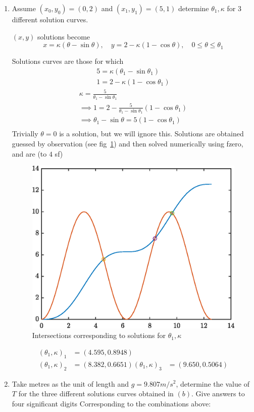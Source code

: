 \documentclass{X:/Documents/Coding/Latex/myassignment}
\begin{document}
\begin{enumerate}
\begin{enumerate}
	\item Assume $(x_0,y_0) = (0,2)$ and $(x_1,y_1) = (5,1)$ determine $\theta_1, \kappa$ for 3 different solution curves.

	$(x,y)$ solutions become
	\[	x = \kappa (\theta - \sin \theta), \quad y = 2- \kappa(1- \cos\theta),\quad 0\leq \theta \leq \theta_1	\]

	Solutions curves are those for which
	\begin{align*}
		5 = \kappa(\theta_1 - \sin\theta_1)\\
		1 = 2-\kappa(1-\cos\theta_1)
	\end{align*}
	\begin{align*}
		\kappa = \frac{5}{\theta_1 - \sin\theta_1}\\
		\implies 1 = 2 - \frac{5}{\theta_1 - \sin\theta_1}(1 - \cos\theta_1)\\
		\implies \theta_1 - \sin\theta = 5(1 - \cos\theta_1)\\
	\end{align*}
	Trivially $\theta = 0$ is a solution, but we will ignore this.
	Solutions are obtained guessed by observation (see fig~\ref{fig:int}) and then solved numerically using fzero, and are (to $4$ sf)
	\begin{figure}[h]
		\centering
		\includegraphics[width = 0.5\linewidth]{IntersectionPlot}
		\caption{Intersections corresponding to solutions for $\theta_1, \kappa$}
		\label{fig:int}
	\end{figure}
	\begin{align*}
		(\theta_1,\kappa)_1 &= (4.595,0.8948)\\
		(\theta_1,\kappa)_2 &= (8.382, 0.6651)
		(\theta_1,\kappa)_3 &= (9.650,0.5064)
	\end{align*}

	\item Take metres as the unit of length and $g=9.807m/s^2$, determine the value of $T$ for the three different solutions curves obtained in $(b)$. Give answers to four significant digits
	Corresponding to the combinations above:


\end{enumerate}
\end{enumerate}
\end{document}
